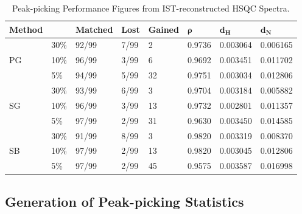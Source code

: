 \begin{table}[h!]
\caption{Peak-picking Performance Figures from IST-reconstructed HSQC Spectra.}
\begin{center}
\begin{tabular}{l l | l l l l l l}
  \hline
  {\bf Method} & & {\bf Matched}       & {\bf Lost}     & {\bf Gained} &
                   $\boldsymbol{\rho}$ & $\mathbf{d_H}$ & $\mathbf{d_N}$ \\
  \hline
     & 30\% & 92/99 & 7/99 &  2 & 0.9736 & 0.003064 & 0.006165 \\
  PG & 10\% & 96/99 & 3/99 &  6 & 0.9692 & 0.003451 & 0.011702 \\
     &  5\% & 94/99 & 5/99 & 32 & 0.9751 & 0.003034 & 0.012806 \\
  \hline
     & 30\% & 93/99 & 6/99 &  3 & 0.9704 & 0.003184 & 0.005882 \\
  SG & 10\% & 96/99 & 3/99 & 13 & 0.9732 & 0.002801 & 0.011357 \\
     &  5\% & 97/99 & 2/99 & 31 & 0.9630 & 0.003450 & 0.014585 \\
  \hline
     & 30\% & 91/99 & 8/99 &  3 & 0.9820 & 0.003319 & 0.008370 \\
  SB & 10\% & 97/99 & 2/99 & 13 & 0.9820 & 0.003045 & 0.012806 \\
     &  5\% & 97/99 & 2/99 & 45 & 0.9575 & 0.003587 & 0.016998 \\
\end{tabular}
\end{center}
\end{table}

\subsection{Generation of Peak-picking Statistics}

